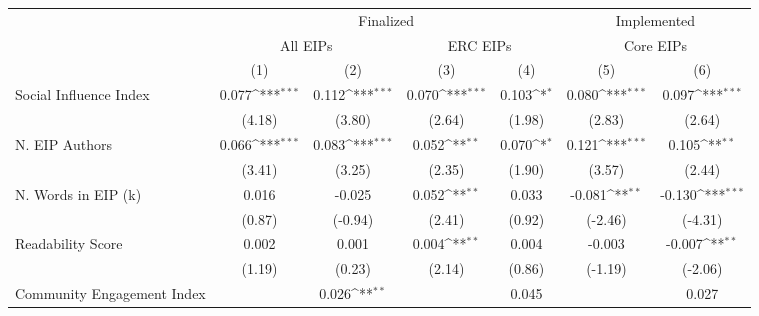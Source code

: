 {
\def\sym#1{\ifmmode^{#1}\else\(^{#1}\)\fi}
\begin{tabular}{l*{6}{c}}
\hline\hline
& \multicolumn{4}{c}{Finalized} &  \multicolumn{2}{c}{Implemented}  \\ \cline{2-5}\cline{6-7}
& \multicolumn{2}{c}{All EIPs} &  \multicolumn{2}{c}{ERC EIPs} &  \multicolumn{2}{c}{Core EIPs} \\ \cline{2-3}\cline{4-5}\cline{6-7}
                                   &\multicolumn{1}{c}{(1)}         &\multicolumn{1}{c}{(2)}         &\multicolumn{1}{c}{(3)}         &\multicolumn{1}{c}{(4)}         &\multicolumn{1}{c}{(5)}         &\multicolumn{1}{c}{(6)}         \\
\hline
Social Influence Index             &       0.077\sym{***}&       0.112\sym{***}&       0.070\sym{***}&       0.103\sym{*}  &       0.080\sym{***}&       0.097\sym{***}\\
                                   &      (4.18)         &      (3.80)         &      (2.64)         &      (1.98)         &      (2.83)         &      (2.64)         \\
[1em]
N. EIP Authors                     &       0.066\sym{***}&       0.083\sym{***}&       0.052\sym{**} &       0.070\sym{*}  &       0.121\sym{***}&       0.105\sym{**} \\
                                   &      (3.41)         &      (3.25)         &      (2.35)         &      (1.90)         &      (3.57)         &      (2.44)         \\
[1em]
N. Words in EIP (k)                &       0.016         &      -0.025         &       0.052\sym{**} &       0.033         &      -0.081\sym{**} &      -0.130\sym{***}\\
                                   &      (0.87)         &     (-0.94)         &      (2.41)         &      (0.92)         &     (-2.46)         &     (-4.31)         \\
[1em]
Readability Score                  &       0.002         &       0.001         &       0.004\sym{**} &       0.004         &      -0.003         &      -0.007\sym{**} \\
                                   &      (1.19)         &      (0.23)         &      (2.14)         &      (0.86)         &     (-1.19)         &     (-2.06)         \\
[1em]
Community Engagement Index         &                     &       0.026\sym{**} &                     &       0.045         &                     &       0.027         \\

\end{tabular}}
